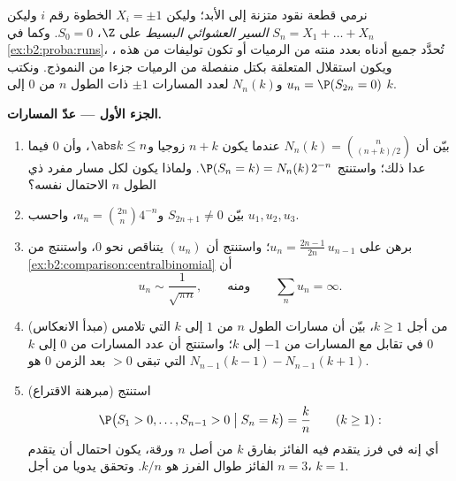 \begin{problem}\label{pb:b2:proba:1}
نرمي قطعة نقود متزنة إلى الأبد؛ وليكن $X_i = \pm1$ الخطوة رقم $i$
وليكن $S_n = X_1 + \dots + X_n$ \emph{السير العشوائي البسيط} على
$\Z$، $S_0 = 0$. وكما في \cref{ex:b2:proba:runs}، تُحدَّد جميع  أدناه بعدد
منته من الرميات أو تكون توليفات  من هذه ، ويكون
استقلال  المتعلقة بكتل منفصلة من الرميات جزءا من النموذج.
ونكتب $u_n =
\P(S_{2n} = 0)$ و$N_n(k)$ لعدد المسارات $\pm1$ ذات الطول $n$ من
$0$ إلى $k$.

\medskip
\noindent\textbf{الجزء الأول --- عدّ المسارات.}
\begin{enumerate}
  \item بيّن أن $N_n(k) = \binom{n}{(n+k)/2}$ عندما يكون $n + k$ زوجيا و$\abs k \leq n$، وأن $0$
        فيما عدا ذلك؛ واستنتج $\P(S_n = k) = N_n(k)\,2^{-n}$. ولماذا يكون لكل مسار مفرد ذي
        الطول $n$ الاحتمال نفسه؟
  \item بيّن $S_{2n+1} \neq 0$ و$u_n =
        \binom{2n}{n}4^{-n}$، واحسب $u_1, u_2, u_3$.
  \item برهن على $u_n = \frac{2n-1}{2n}\,u_{n-1}$؛ واستنتج أن $(u_n)$ يتناقص نحو $0$،
        واستنتج من \cref{ex:b2:comparison:centralbinomial} أن
        \[
        u_n \sim \frac{1}{\sqrt{\pi n}},
        \qquad\text{ومنه}\qquad
        \sum_n u_n = \infty .
        \]
  \item (مبدأ الانعكاس) من أجل $k \geq 1$، بيّن أن مسارات الطول $n$
        من $1$ إلى $k$ التي تلامس $0$ في تقابل مع
        المسارات من $-1$ إلى $k$؛ واستنتج أن عدد المسارات من
        $0$ إلى $k$ التي تبقى $> 0$ بعد الزمن $0$ هو
        $N_{n-1}(k-1) -
        N_{n-1}(k+1)$.
  \item (مبرهنة الاقتراع) استنتج
        \[
        \P\bigl(S_1 > 0, \dots, S_{n-1} > 0 \bigm| S_n =
        k\bigr) = \frac kn \qquad (k \geq 1) :
        \]
        أي إنه في فرز يتقدم فيه الفائز بفارق $k$ من أصل $n$
        ورقة، يكون احتمال أن يتقدم الفائز طوال الفرز هو $k/n$.
        وتحقق يدويا من أجل $n = 3$، $k =
        1$.
\end{enumerate}


\end{problem}
